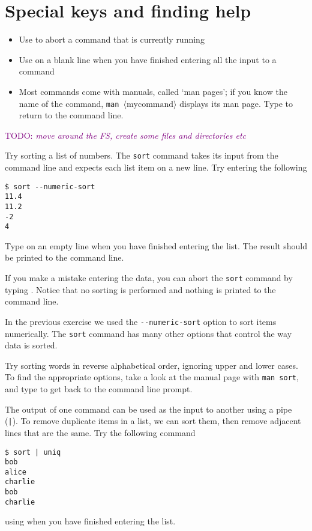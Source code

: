 \documentclass[a4paper,twoside]{memoir}
\makeatletter
\newcommand{\FrameTitle}[2]{%
  \fboxrule=\FrameRule \fboxsep=\FrameSep
  \fbox{\vbox{\nobreak \vskip -0.7\FrameSep
    \rlap{\centerline{\strut#1}}\nobreak\nointerlineskip%
    \vskip 0.7\FrameSep
    \hbox{#2}}}}
\newenvironment{framewithtitle}[2][\FrameFirst@Lab\ (cont.)]{%
  \def\FrameFirst@Lab{\textbf{#2}}%
  \def\FrameCont@Lab{\textbf{#1}}%
  \def\FrameCommand##1{%
    \FrameTitle{\FrameFirst@Lab}{##1}}%
  \def\FirstFrameCommand##1{%
    \FrameTitle{\FrameFirst@Lab}{##1}}%
  \def\MidFrameCommand##1{%
    \FrameTitle{\FrameCont@Lab}{##1}}%
  \def\LastFrameCommand##1{%
    \FrameTitle{\FrameCont@Lab}{##1}}%
\MakeFramed{\advance\hsize-\width \FrameRestore}}%
{\endMakeFramed}
\newcounter{exercisectr}
\newenvironment{exercise}
{\stepcounter{exercisectr}\begin{framewithtitle}{Practical \arabic{exercisectr}}}
{\end{framewithtitle}}
\newcommand{\shellcmd}{\texttt}
\newcommand{\shellvar}[1]{$\langle \text{#1}\rangle$}
\newcommand{\additional}{\medskip\noindent{\textit{Additional exercises}}}
\newcommand{\TODO}[1]{\textcolor{purple}{TODO: \emph{#1}}}
\makeatother
\begin{document}
\section{Special keys and finding help}

\begin{itemize}
\item Use  to abort a command that is currently running
\item Use  on a blank line when you have finished entering all the input to a command
\item Most commands come with manuals, called `man pages'; if you know the name of the command, \shellcmd{man \shellvar{mycommand}} displays its man page.  Type  to return to the command line.
\end{itemize}

\begin{exercise}
\TODO{move around the FS, create some files and directories etc}

Try sorting a list of numbers.  The \shellcmd{sort} command takes its input from the command line and expects each list item on a new line.  Try entering the following
\begin{verbatim}
$ sort --numeric-sort
11.4
11.2
-2
4
\end{verbatim}
Type  on an empty line when you have finished entering the list.  The result should be printed to the command line.

If you make a mistake entering the data, you can abort the \shellcmd{sort} command by typing .  Notice that no sorting is performed and nothing is printed to the command line.

\additional

In the previous exercise we used the \shellcmd{-{}-numeric-sort} option to sort items numerically.  The \shellcmd{sort} command has many other options that control the way data is sorted.

Try sorting words in reverse alphabetical order, ignoring upper and lower cases.  To find the appropriate options, take a look at the manual page with \shellcmd{man sort}, and type  to get back to the command line prompt.

The output of one command can be used as the input to another using a pipe (\shellcmd{|}).  To remove duplicate items in a list, we can sort them, then remove adjacent lines that are the same.  Try the following command
\begin{verbatim}
$ sort | uniq
bob
alice
charlie
bob
charlie
\end{verbatim}
using  when you have finished entering the list.
\end{exercise}
\end{document}
